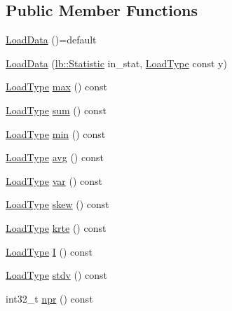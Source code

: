 \subsection*{Public Member Functions}
\begin{DoxyCompactItemize}
\item 
\hyperlink{structvt_1_1vrt_1_1collection_1_1balance_1_1_load_data_afc2d1f780b2a168ec80f0cf28c830847}{Load\+Data} ()=default
\item 
\hyperlink{structvt_1_1vrt_1_1collection_1_1balance_1_1_load_data_a8acffba020b78994fbfe5f9f899de608}{Load\+Data} (\hyperlink{namespacevt_1_1vrt_1_1collection_1_1lb_af0e20ef9afee77295053aa83bf1348b1}{lb\+::\+Statistic} in\+\_\+stat, \hyperlink{namespacevt_a8fb51741340b87d7aaee0bef60e9896b}{Load\+Type} const y)
\item 
\hyperlink{namespacevt_a8fb51741340b87d7aaee0bef60e9896b}{Load\+Type} \hyperlink{structvt_1_1vrt_1_1collection_1_1balance_1_1_load_data_ac4df9aeffa9c1dad77730af6d242e274}{max} () const
\item 
\hyperlink{namespacevt_a8fb51741340b87d7aaee0bef60e9896b}{Load\+Type} \hyperlink{structvt_1_1vrt_1_1collection_1_1balance_1_1_load_data_a0709796554317c54199e412d78ed1628}{sum} () const
\item 
\hyperlink{namespacevt_a8fb51741340b87d7aaee0bef60e9896b}{Load\+Type} \hyperlink{structvt_1_1vrt_1_1collection_1_1balance_1_1_load_data_a6892551f9c3da503570f9ac804203166}{min} () const
\item 
\hyperlink{namespacevt_a8fb51741340b87d7aaee0bef60e9896b}{Load\+Type} \hyperlink{structvt_1_1vrt_1_1collection_1_1balance_1_1_load_data_a0c6e0af320efc3a785af36792953486b}{avg} () const
\item 
\hyperlink{namespacevt_a8fb51741340b87d7aaee0bef60e9896b}{Load\+Type} \hyperlink{structvt_1_1vrt_1_1collection_1_1balance_1_1_load_data_a5ba3f298d2d3d6736c02e9a765261af6}{var} () const
\item 
\hyperlink{namespacevt_a8fb51741340b87d7aaee0bef60e9896b}{Load\+Type} \hyperlink{structvt_1_1vrt_1_1collection_1_1balance_1_1_load_data_a6027195b66e44eb7ccef297360c95685}{skew} () const
\item 
\hyperlink{namespacevt_a8fb51741340b87d7aaee0bef60e9896b}{Load\+Type} \hyperlink{structvt_1_1vrt_1_1collection_1_1balance_1_1_load_data_aff019f185604c133af25a18047f80a97}{krte} () const
\item 
\hyperlink{namespacevt_a8fb51741340b87d7aaee0bef60e9896b}{Load\+Type} \hyperlink{structvt_1_1vrt_1_1collection_1_1balance_1_1_load_data_a761a152facd42ef5a69b8ae3bf678ccf}{I} () const
\item 
\hyperlink{namespacevt_a8fb51741340b87d7aaee0bef60e9896b}{Load\+Type} \hyperlink{structvt_1_1vrt_1_1collection_1_1balance_1_1_load_data_ad9157d4a00bce2f6c4eb745bdee3080e}{stdv} () const
\item 
int32\+\_\+t \hyperlink{structvt_1_1vrt_1_1collection_1_1balance_1_1_load_data_a177178abc3a99dbbe51c5873e86f1ada}{npr} () const
\end{DoxyCompactItemize}
